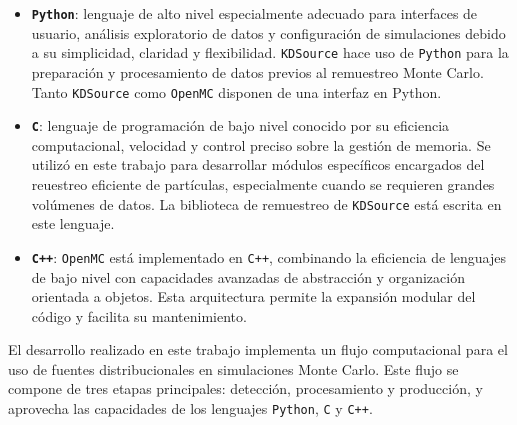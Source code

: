 

\begin{itemize}
    \item \textbf{\texttt{Python}}: lenguaje de alto nivel especialmente adecuado para interfaces de usuario, análisis exploratorio de datos y configuración de simulaciones debido a su simplicidad, claridad y flexibilidad. \texttt{KDSource} hace uso de \texttt{Python} para la preparación y procesamiento de datos previos al remuestreo Monte Carlo. Tanto \texttt{KDSource} como \texttt{OpenMC} disponen de una interfaz en Python.

    \item \textbf{\texttt{C}}: lenguaje de programación de bajo nivel conocido por su eficiencia computacional, velocidad y control preciso sobre la gestión de memoria. Se utilizó en este trabajo para desarrollar módulos específicos encargados del reuestreo eficiente de partículas, especialmente cuando se requieren grandes volúmenes de datos. La biblioteca de remuestreo de \texttt{KDSource} está escrita en este lenguaje.

    \item \textbf{\texttt{C++}}: \texttt{OpenMC} está implementado en \texttt{C++}, combinando la eficiencia de lenguajes de bajo nivel con capacidades avanzadas de abstracción y organización orientada a objetos. Esta arquitectura permite la expansión modular del código y facilita su mantenimiento.
\end{itemize}


El desarrollo realizado en este trabajo implementa un flujo computacional para el uso de fuentes distribucionales en simulaciones Monte Carlo. Este flujo se compone de tres etapas principales: detección, procesamiento y producción, y aprovecha las capacidades de los lenguajes \texttt{Python}, \texttt{C} y \texttt{C++}.

